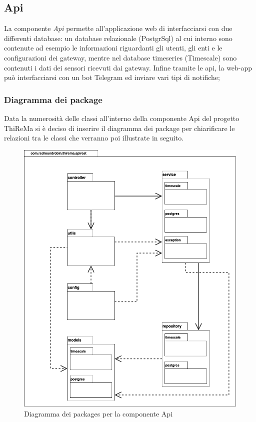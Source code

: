\subsection{Api}
	La componente \textit{Api} permette all'applicazione web di interfacciarsi con due differenti database: un database relazionale (PostgrSql) al cui interno sono contenute ad esempio le informazioni riguardanti gli utenti, gli enti e le configurazioni dei gateway, mentre nel database timeseries (Timescale) sono contenuti i dati dei sensori ricevuti dai gateway.
	Infine tramite le api, la web-app può interfacciarsi con un bot Telegram ed inviare vari tipi di notifiche;
	\subsubsection{Diagramma dei package}
		Data la numerosità delle classi all'interno della componente Api del progetto ThiReMa si è deciso di inserire il diagramma dei package per chiarificare le relazioni tra le classi che verranno poi illustrate in seguito.
		\begin{figure}[H]
			\centering
			\includegraphics[scale=0.600]{res/images/API/packageAPI.png}
			\caption{Diagramma dei packages per la componente Api}
		\end{figure}

